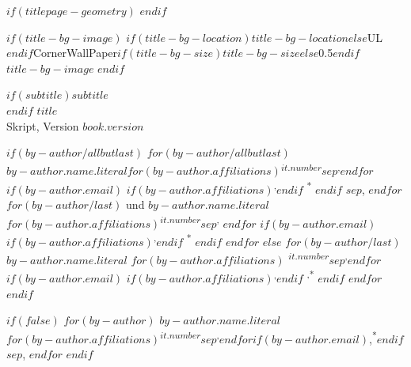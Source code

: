 
$if(titlepage-geometry)$
$endif$
\begin{minipage}[b][\textheight][s]{\textwidth}
\raggedright

$if(title-bg-image)$
\This$if(title-bg-location)$$title-bg-location$$else$UL$endif$CornerWallPaper{$if(title-bg-size)$$title-bg-size$$else$0.5$endif$}{$title-bg-image$}
$endif$

\begin{center}
$if(subtitle)${\LARGE{$subtitle$}}\\[4\baselineskip]$endif$
{\Huge\bfseries\nohyphens{$title$}}\\[1\baselineskip] 
{\LARGE Skript, Version {$book.version$}}\\[4\baselineskip]
\end{center}

$if(by-author/allbutlast)$
$for(by-author/allbutlast)$
 {\large{$by-author.name.literal$}}$for(by-author.affiliations)${\textsuperscript{$it.number$}}$sep$\textsuperscript{,}$endfor$%
$if(by-author.email)$%
$if(by-author.affiliations)$\textsuperscript{,}$endif$%
{\textsuperscript{*}}%
$endif$%
$sep$, 
$endfor$
$for(by-author/last)$%
{ und \large{$by-author.name.literal$}}%
$for(by-author.affiliations)${\textsuperscript{$it.number$}}$sep$\textsuperscript{,}%
$endfor$%
$if(by-author.email)$%
$if(by-author.affiliations)$\textsuperscript{,}$endif$%
{\textsuperscript{*}}%
$endif$%
$endfor$
$else$
$for(by-author/last)$%
{\large{$by-author.name.literal$}}%
$for(by-author.affiliations)$%
{\textsuperscript{$it.number$}}$sep$\textsuperscript{,}$endfor$%
$if(by-author.email)$%
$if(by-author.affiliations)$\textsuperscript{,}$endif$%
{\textsuperscript{,*}}%
$endif$%
$endfor$
$endif$

$if(false)$
  $for(by-author)$
    {$by-author.name.literal$}$for(by-author.affiliations)${\textsuperscript{$it.number$}}$sep${\textsuperscript{,}}$endfor$$if(by-author.email)$,{\textsuperscript{*}}$endif$$sep$, 
$endfor$
$endif$

\vspace{2\baselineskip} 


\end{minipage}
